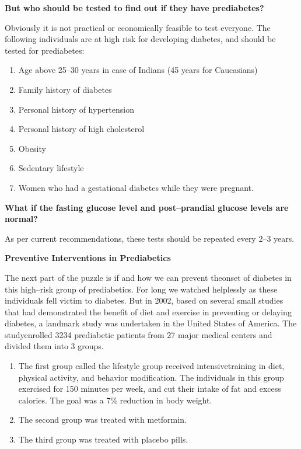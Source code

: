 \noindent\textbf{But who should be tested to find out if they have prediabetes?}

Obviously it is not practical or economically feasible to test everyone. The following individuals are at high risk for developing diabetes, and should be tested for prediabetes:

\vspace{-\topsep}
\begin{enumerate}[•]
\itemsep=0pt
\item Age above 25–30 years in case of Indians (45 years for Caucasians)
\item Family history of diabetes
\item Personal history of hypertension
\item Personal history of high cholesterol
\item Obesity
\item Sedentary lifestyle
\item Women who had a gestational diabetes while they were pregnant.
\end{enumerate}
\vspace{-\topsep}

\noindent\textbf{What if the fasting glucose level and post–prandial glucose levels are normal?}

As per current recommendations, these tests should be repea\-ted every 2–3 years.

\noindent\textbf{Preventive Interventions in Prediabetics}

The next part of the puzzle is if and how we can prevent the\break onset of diabetes in this high–risk group of prediabetics. For long we watched helplessly as these individuals fell victim to diabetes. But in 2002, based on several small studies that had demonstrated the bene\-fit of diet and exercise in preventing or delaying diabetes, a landmark study was under\-taken in the United States of America. The study\break enrolled 3234 prediabetic patients from 27 major medical centers and divided them into 3 groups.

\vspace{-\topsep}
\begin{enumerate}[•]
\itemsep=0pt
\item The first group called the lifestyle group received intensive\break training in diet, physical activity, and behavior modification. The indi\-viduals in this group exercised for 150 minutes per week, and cut their intake of fat and excess calories. The goal was a 7\% reduction in body weight.
\item The second group was treated with metformin.
\item The third group was treated with placebo pills.
\end{enumerate}
\vspace{-\topsep}

